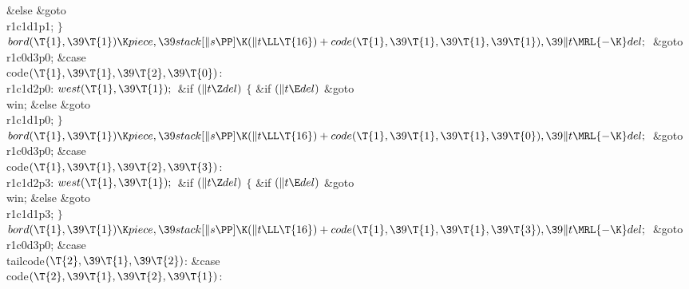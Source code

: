 \2\&{else}\1\5
\&{goto} \\{r1c1d1p1};\5
\2${}\}{}$\2\6
${}\\{bord}(\T{1},\39\T{1})\K\\{piece},\39\\{stack}[\|s\PP]\K(\|t\LL\T{16})+%
\\{code}(\T{1},\39\T{1},\39\T{1},\39\T{1}),\39\|t\MRL{-{\K}}\\{del};{}$\6
\&{goto} \\{r1c0d3p0};\6
\4\&{case} \\{code}${}(\T{1},\39\T{1},\39\T{2},\39\T{0}){}$:\5
\\{r1c1d2p0}:\5
${}\\{west}(\T{1},\39\T{1});{}$\6
\&{if} ${}(\|t\Z\\{del}){}$\5
${}\{{}$\5
\1\&{if} ${}(\|t\E\\{del}){}$\1\5
\&{goto} \\{win};\5
\2\&{else}\1\5
\&{goto} \\{r1c1d1p0};\5
\2${}\}{}$\2\6
${}\\{bord}(\T{1},\39\T{1})\K\\{piece},\39\\{stack}[\|s\PP]\K(\|t\LL\T{16})+%
\\{code}(\T{1},\39\T{1},\39\T{1},\39\T{0}),\39\|t\MRL{-{\K}}\\{del};{}$\6
\&{goto} \\{r1c0d3p0};\6
\4\&{case} \\{code}${}(\T{1},\39\T{1},\39\T{2},\39\T{3}){}$:\5
\\{r1c1d2p3}:\5
${}\\{west}(\T{1},\39\T{1});{}$\6
\&{if} ${}(\|t\Z\\{del}){}$\5
${}\{{}$\5
\1\&{if} ${}(\|t\E\\{del}){}$\1\5
\&{goto} \\{win};\5
\2\&{else}\1\5
\&{goto} \\{r1c1d1p3};\5
\2${}\}{}$\2\6
${}\\{bord}(\T{1},\39\T{1})\K\\{piece},\39\\{stack}[\|s\PP]\K(\|t\LL\T{16})+%
\\{code}(\T{1},\39\T{1},\39\T{1},\39\T{3}),\39\|t\MRL{-{\K}}\\{del};{}$\6
\&{goto} \\{r1c0d3p0};\6
\4\&{case} \\{tailcode}${}(\T{2},\39\T{1},\39\T{2}){}$:\5
\&{case} \\{code}${}(\T{2},\39\T{1},\39\T{2},\39\T{1}){}$:\5
